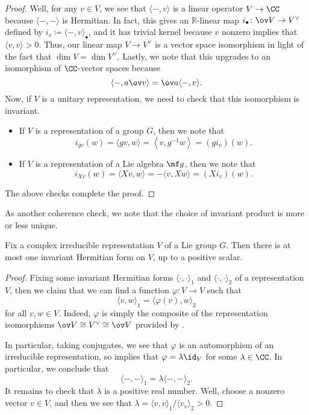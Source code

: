 \documentclass[../notes.tex]{subfiles}
\begin{document}
\begin{proof}
	Well, for any $v\in V$, we see that $\langle-,v\rangle$ is a linear operator $V\to\CC$ because $\langle-,-\rangle$ is Hermitian. In fact, this gives an $\mathbb R$-linear map $i_\bullet\colon\ov V\to V^\lor$ defined by $i_v\coloneqq\langle-,v\rangle_\bullet$, and it has trivial kernel because $v$ nonzero implies that $\langle v,v\rangle>0$. Thus, our linear map $V\to V^\lor$ is a vector space isomorphism in light of the fact that $\dim V=\dim V^\lor$. Lastly, we note that this upgrades to an isomorphism of $\CC$-vector spaces because
	\[\langle-,a\ov v\rangle=\ov a\langle-,v\rangle.\]
	Now, if $V$ is a unitary representation, we need to check that this isomorphism is invariant.
	\begin{itemize}
		\item If $V$ is a representation of a group $G$, then we note that
		\[i_{gv}(w)=\langle gv,w\rangle=\left\langle v,g^{-1}w\right\rangle=(gi_v)(w).\]
		\item If $V$ is a representation of a Lie algebra $\mf g$, then we note that
		\[i_{Xv}(w)=\langle Xv,w\rangle=-\langle v,Xw\rangle=(Xi_v)(w).\]
	\end{itemize}
	The above checks complete the proof.
\end{proof}
As another coherence check, we note that the choice of invariant product is more or less unique.
\begin{proposition}
	Fix a complex irreducible representation $V$ of a Lie group $G$. Then there is at most one invariant Hermitian form on $V$, up to a positive scalar.
\end{proposition}
\begin{proof}
	Fixing some invariant Hermitian forms $\langle\cdot,\cdot\rangle_1$ and $\langle\cdot,\cdot\rangle_2$ of a representation $V$, then we claim that we can find a function $\varphi\colon V\to V$ such that
	\[\langle v,w\rangle_1=\langle\varphi(v),w\rangle_2\]
	for all $v,w\in V$. Indeed, $\varphi$ is simply the composite of the representation isomorphisms $\ov V\cong V^\lor\cong\ov V$ provided by .

	In particular, taking conjugates, we see that $\varphi$ is an automorphism of an irreducible representation, so  implies that $\varphi=\lambda\id_V$ for some $\lambda\in\CC$. In particular, we conclude that
	\[\langle-,-\rangle_1=\lambda\langle-,-\rangle_2.\]
	It remains to check that $\lambda$ is a positive real number. Well, choose a nonzero vector $v\in V$, and then we see that $\lambda=\langle v,v\rangle_1/\langle v_v\rangle_2>0$.
\end{proof}
\end{document}
